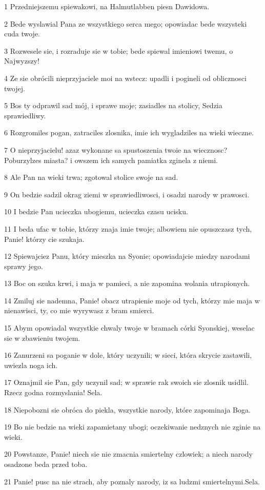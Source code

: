 \par 1 Przedniejszemu spiewakowi, na Halmutlabben piesn Dawidowa.
\par 2 Bede wyslawial Pana ze wszystkiego serca mego; opowiadac bede wszysteki cuda twoje.
\par 3 Rozwesele sie, i rozraduje sie w tobie; bede spiewal imieniowi twemu, o Najwyzszy!
\par 4 Ze sie obrócili nieprzyjaciele moi na wstecz: upadli i pogineli od oblicznosci twojej.
\par 5 Bos ty odprawil sad mój, i sprawe moje; zasiadles na stolicy, Sedzia sprawiedliwy.
\par 6 Rozgromiles pogan, zatraciles zlosnika, imie ich wygladziles na wieki wieczne.
\par 7 O nieprzyjacielu! azaz wykonane sa spustoszenia twoie na wiecznosc? Poburzylzes miasta? i owszem ich samych pamiatka zginela z niemi.
\par 8 Ale Pan na wieki trwa; zgotowal stolice swoje na sad.
\par 9 On bedzie sadzil okrag ziemi w sprawiedliwosci, i osadzi narody w prawosci.
\par 10 I bedzie Pan ucieczka ubogiemu, ucieczka czasu ucisku.
\par 11 I beda ufac w tobie, którzy znaja imie twoje; albowiem nie opuszczasz tych, Panie! którzy cie szukaja.
\par 12 Spiewajciez Panu, który mieszka na Syonie; opowiadajcie miedzy narodami sprawy jego.
\par 13 Boc on szuka krwi, i maja w pamieci, a nie zapomina wolania utrapionych.
\par 14 Zmiluj sie nademna, Panie! obacz utrapienie moje od tych, którzy mie maja w nienawisci, ty, co mie wyrywasz z bram smierci.
\par 15 Abym opowiadal wszystkie chwaly twoje w bramach córki Syonskiej, weselac sie w zbawieniu twojem.
\par 16 Zanurzeni sa poganie w dole, który uczynili; w sieci, która skrycie zastawili, uwiezla noga ich.
\par 17 Oznajmil sie Pan, gdy uczynil sad; w sprawie rak swoich sie zlosnik usidlil. Rzecz godna rozmyslania! Sela.
\par 18 Niepobozni sie obróca do piekla, wszystkie narody, które zapominaja Boga.
\par 19 Bo nie bedzie na wieki zapamietany ubogi; oczekiwanie nedznych nie zginie na wieki.
\par 20 Powstanze, Panie! niech sie nie zmacnia smiertelny czlowiek; a niech narody osadzone beda przed toba.
\par 21 Panie! pusc na nie strach, aby poznaly narody, iz sa ludzmi smiertelnymi.Sela.


